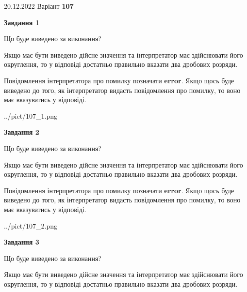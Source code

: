 \documentclass[12pt, ukrainian]{article}
\begin{document}
{20.12.2022 Варіант \No \textbf { 107 }\par}
{
\begin {Large}

{\begin {center}\textbf{Завдання 1}\end {center}}\par
Що буде виведено за виконання? \par

Якщо має бути виведено дійсне значення та інтерпретатор має здійснювати його округлення, 
то у відповіді достатньо правильно вказати два дробових розряди.

Повідомлення інтерпретатора про помилку позначати \textbf{error}.
Якщо щось буде виведено до того, як інтерпретатор видасть повідомлення про помилку, 
то воно має вказуватись у відповіді. \par

\begin{center}
	{../pict/107_1.png}
\end{center}
\newpage

{\begin {center}\textbf{Завдання 2}\end {center}}\par
Що буде виведено за виконання? \par

Якщо має бути виведено дійсне значення та інтерпретатор має здійснювати його округлення, 
то у відповіді достатньо правильно вказати два дробових розряди.

Повідомлення інтерпретатора про помилку позначати \textbf{error}.
Якщо щось буде виведено до того, як інтерпретатор видасть повідомлення про помилку, 
то воно має вказуватись у відповіді. \par

\begin{center}
	{../pict/107_2.png}
\end{center}
\newpage

{\begin {center}\textbf{Завдання 3}\end {center}}\par
Що буде виведено за виконання? \par

Якщо має бути виведено дійсне значення та інтерпретатор має здійснювати його округлення, 
то у відповіді достатньо правильно вказати два дробових розряди.


\end{Large}}
\end{document}
